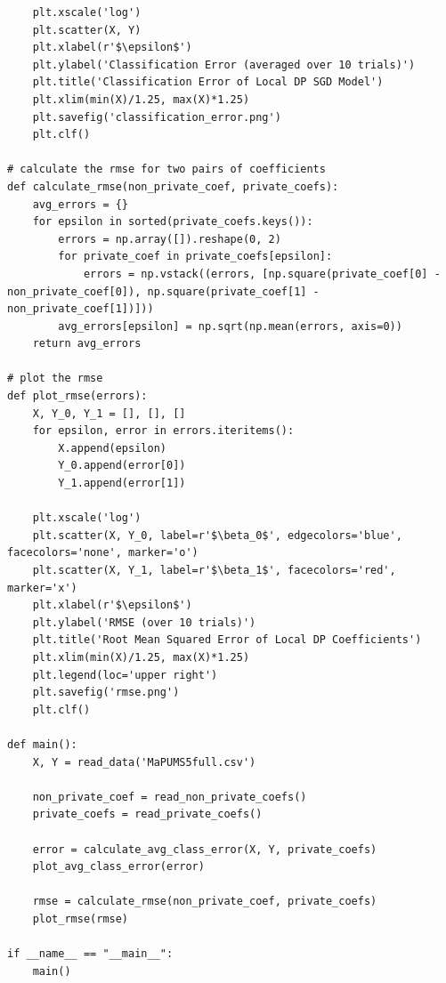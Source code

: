 \documentclass[12pt]{article}
\begin{document}
\begin{appendices}
\begin{lstlisting}
    plt.xscale('log')
    plt.scatter(X, Y)
    plt.xlabel(r'$\epsilon$')
    plt.ylabel('Classification Error (averaged over 10 trials)')
    plt.title('Classification Error of Local DP SGD Model')
    plt.xlim(min(X)/1.25, max(X)*1.25)
    plt.savefig('classification_error.png')
    plt.clf()

# calculate the rmse for two pairs of coefficients
def calculate_rmse(non_private_coef, private_coefs):
    avg_errors = {}
    for epsilon in sorted(private_coefs.keys()):
        errors = np.array([]).reshape(0, 2)
        for private_coef in private_coefs[epsilon]:
            errors = np.vstack((errors, [np.square(private_coef[0] - non_private_coef[0]), np.square(private_coef[1] - non_private_coef[1])]))
        avg_errors[epsilon] = np.sqrt(np.mean(errors, axis=0))
    return avg_errors

# plot the rmse
def plot_rmse(errors):
    X, Y_0, Y_1 = [], [], []
    for epsilon, error in errors.iteritems():
        X.append(epsilon)
        Y_0.append(error[0])
        Y_1.append(error[1])

    plt.xscale('log')
    plt.scatter(X, Y_0, label=r'$\beta_0$', edgecolors='blue', facecolors='none', marker='o')
    plt.scatter(X, Y_1, label=r'$\beta_1$', facecolors='red', marker='x')
    plt.xlabel(r'$\epsilon$')
    plt.ylabel('RMSE (over 10 trials)')
    plt.title('Root Mean Squared Error of Local DP Coefficients')
    plt.xlim(min(X)/1.25, max(X)*1.25)
    plt.legend(loc='upper right')
    plt.savefig('rmse.png')
    plt.clf()

def main():
    X, Y = read_data('MaPUMS5full.csv')

    non_private_coef = read_non_private_coefs()
    private_coefs = read_private_coefs()

    error = calculate_avg_class_error(X, Y, private_coefs)
    plot_avg_class_error(error)

    rmse = calculate_rmse(non_private_coef, private_coefs)
    plot_rmse(rmse)

if __name__ == "__main__":
    main()
\end{lstlisting}

\end{appendices}
\end{document}
